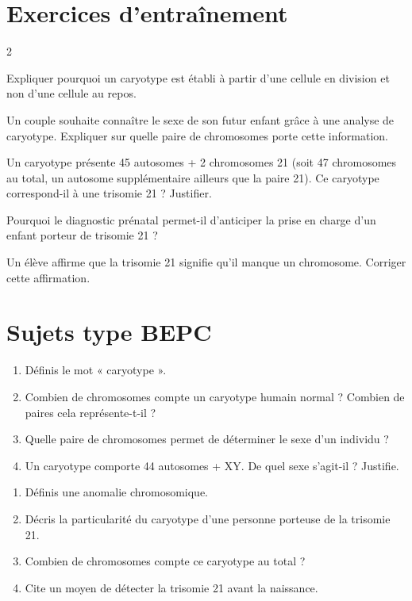 \section{Exercices d'entraînement}
\begin{multicols}{2}

\exo{} Expliquer pourquoi un caryotype est établi à partir d'une cellule en
division et non d'une cellule au repos.

\exo{} Un couple souhaite connaître le sexe de son futur enfant grâce à une
analyse de caryotype. Expliquer sur quelle paire de chromosomes porte cette
information.

\exo{} Un caryotype présente 45 autosomes + 2 chromosomes 21 (soit 47
chromosomes au total, un autosome supplémentaire ailleurs que la paire 21). Ce
caryotype correspond-il à une trisomie 21 ? Justifier.

\exo{} Pourquoi le diagnostic prénatal permet-il d'anticiper la prise en charge
d'un enfant porteur de trisomie 21 ?

\exo{} Un élève affirme que la trisomie 21 signifie qu'il manque un chromosome.
Corriger cette affirmation.

\end{multicols}

\section{Sujets type BEPC}

\begin{enumerate}[label=\arabic*)]
\item Définis le mot « caryotype ».
\item Combien de chromosomes compte un caryotype humain normal ? Combien de paires
cela représente-t-il ?
\item Quelle paire de chromosomes permet de déterminer le sexe d'un individu ?
\item Un caryotype comporte 44 autosomes + XY. De quel sexe s'agit-il ? Justifie.
\end{enumerate}

\sujetbac[La trisomie 21]
\begin{enumerate}[label=\arabic*)]
\item Définis une anomalie chromosomique.
\item Décris la particularité du caryotype d'une personne porteuse de la trisomie 21.
\item Combien de chromosomes compte ce caryotype au total ?
\item Cite un moyen de détecter la trisomie 21 avant la naissance.
\end{enumerate}

